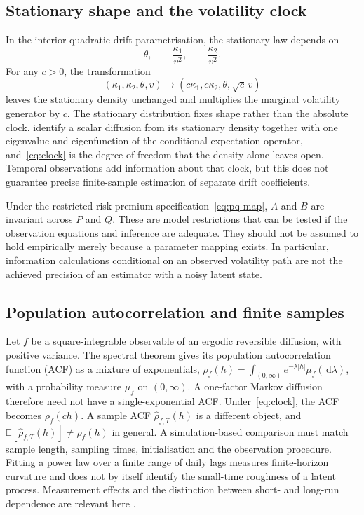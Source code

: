 \documentclass[11pt,a4paper]{article}
\theoremstyle{definition}
\theoremstyle{remark}
\newcommand{\E}{\mathbb{E}}
\newcommand{\dd}{\,\mathrm{d}}
\begin{document}
\subsection{Stationary shape and the volatility clock}

In the interior quadratic-drift parametrisation, the stationary law depends on
\[
 \theta,\qquad \frac{\kappa_1}{v^2},\qquad \frac{\kappa_2}{v^2}.
\]
For any \(c>0\), the transformation
\begin{equation}
 (\kappa_1,\kappa_2,\theta,v)
 \longmapsto(c\kappa_1,c\kappa_2,\theta,\sqrt c\,v)
 \label{eq:clock}
\end{equation}
leaves the stationary density unchanged and multiplies the marginal volatility generator by \(c\). The stationary distribution fixes shape rather than the absolute clock. \citet{HansenScheinkmanTouzi1998} identify a scalar diffusion from its stationary density together with one eigenvalue and eigenfunction of the conditional-expectation operator, and~\eqref{eq:clock} is the degree of freedom that the density alone leaves open. Temporal observations add information about that clock, but this does not guarantee precise finite-sample estimation of separate drift coefficients.

Under the restricted risk-premium specification~\eqref{eq:pq-map}, \(A\) and \(B\) are invariant across \(P\) and \(Q\). These are model restrictions that can be tested if the observation equations and inference are adequate. They should not be assumed to hold empirically merely because a parameter mapping exists. In particular, information calculations conditional on an observed volatility path are not the achieved precision of an estimator with a noisy latent state.

\subsection{Population autocorrelation and finite samples}

Let \(f\) be a square-integrable observable of an ergodic reversible diffusion, with positive variance. The spectral theorem gives its population autocorrelation function (ACF) as a mixture of exponentials, \(\rho_f(h)=\int_{(0,\infty)}e^{-\lambda|h|}\mu_f(\dd\lambda)\), with a probability measure \(\mu_f\) on \((0,\infty)\). A one-factor Markov diffusion therefore need not have a single-exponential ACF. Under~\eqref{eq:clock}, the ACF becomes \(\rho_f(ch)\). A sample ACF \(\widehat\rho_{f,T}(h)\) is a different object, and \(\E[\widehat\rho_{f,T}(h)]\neq\rho_f(h)\) in general. A simulation-based comparison must match sample length, sampling times, initialisation and the observation procedure. Fitting a power law over a finite range of daily lags measures finite-horizon curvature and does not by itself identify the small-time roughness of a latent process. Measurement effects and the distinction between short- and long-run dependence are relevant here \citep{ContDas2024,BennedsenLundePakkanen2022}.
\end{document}
